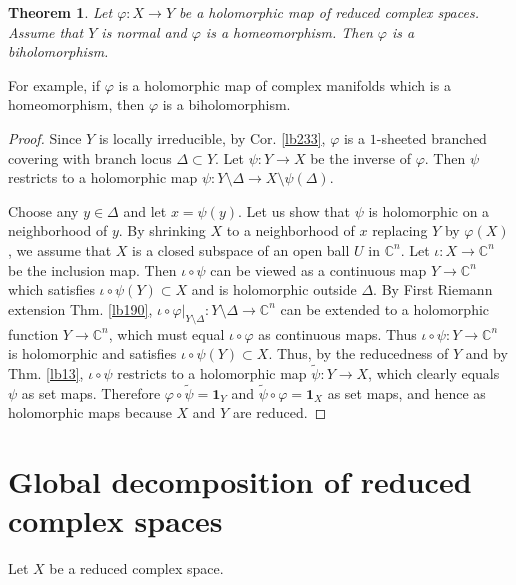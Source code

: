 \documentclass[12pt,b5paper,notitlepage]{report}
\theoremstyle{definition}
\theoremstyle{plain}
\newtheorem{thm}[df]{Theorem}
\newcommand{\wtd}{\widetilde}
\newcommand{\id}{\mathbf{1}}
\newcommand{\Cbb}{\mathbb C}
\numberwithin{equation}{section}
\begin{document}
\begin{thm}
Let $\varphi:X\rightarrow Y$ be a holomorphic map of reduced complex spaces. Assume that $Y$ is normal and $\varphi$ is a homeomorphism. Then $\varphi$ is a biholomorphism.
\end{thm}

For example, if $\varphi$ is a holomorphic map of complex manifolds which is a homeomorphism, then $\varphi$ is a biholomorphism.

\begin{proof}
Since $Y$ is locally irreducible, by Cor. \ref{lb233}, $\varphi$ is a $1$-sheeted branched covering with branch locus $\Delta\subset Y$. Let $\psi:Y\rightarrow X$ be the inverse of $\varphi$. Then $\psi$ restricts to a holomorphic map $\psi:Y\setminus\Delta\rightarrow X\setminus\psi(\Delta)$. 

Choose any $y\in\Delta$ and let $x=\psi(y)$. Let us show that $\psi$ is holomorphic on a neighborhood of $y$. By shrinking $X$ to a neighborhood of $x$ replacing $Y$ by $\varphi(X)$, we assume that $X$ is a closed subspace of an open ball $U$ in $\Cbb^n$. Let $\iota:X\rightarrow \Cbb^n$ be the inclusion map. Then $\iota\circ\psi$ can be viewed as a continuous map $Y\rightarrow\Cbb^n$ which satisfies $\iota\circ\psi(Y)\subset X$ and is holomorphic outside $\Delta$. By First Riemann extension Thm. \ref{lb190}, $\iota\circ\varphi|_{Y\setminus\Delta}:Y\setminus\Delta\rightarrow\Cbb^n$ can be extended to a holomorphic function $Y\rightarrow\Cbb^n$, which must equal $\iota\circ\varphi$ as continuous maps. Thus $\iota\circ\psi:Y\rightarrow\Cbb^n$ is holomorphic and satisfies $\iota\circ\psi(Y)\subset X$. Thus, by the reducedness of $Y$ and by Thm. \ref{lb13}, $\iota\circ\psi$ restricts to a holomorphic map $\wtd\psi:Y\rightarrow X$, which clearly equals $\psi$ as set maps. Therefore $\varphi\circ\wtd\psi=\id_Y$ and $\wtd\psi\circ\varphi=\id_X$ as set maps, and hence as holomorphic maps because $X$ and $Y$ are reduced.
\end{proof}










\section{Global decomposition of reduced complex spaces}



Let $X$ be a reduced complex space.
\end{document}
